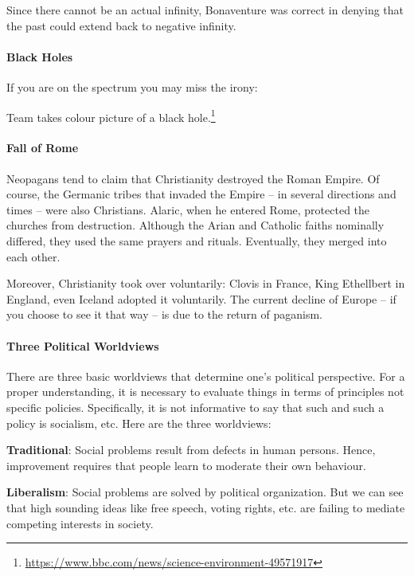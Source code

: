 Since there cannot be an actual infinity, Bonaventure was correct in denying that the past could extend back to negative infinity.

\paragraph{Black Holes}


If you are on the spectrum you may miss the irony:

Team takes colour picture of a black hole.\footnote{\url{https://www.bbc.com/news/science-environment-49571917}}

\paragraph{Fall of Rome}


Neopagans tend to claim that Christianity destroyed the Roman Empire. Of course, the Germanic tribes that invaded the Empire -- in several directions and times -- were also Christians. Alaric, when he entered Rome, protected the churches from destruction. Although the Arian and Catholic faiths nominally differed, they used the same prayers and rituals. Eventually, they merged into each other.

Moreover, Christianity took over voluntarily: Clovis in France, King Ethellbert in England, even Iceland adopted it voluntarily. The current decline of Europe -- if you choose to see it that way -- is due to the return of paganism.

\paragraph{Three Political Worldviews}


There are three basic worldviews that determine one's political perspective. For a proper understanding, it is necessary to evaluate things in terms of principles not specific policies. Specifically, it is not informative to say that such and such a policy is socialism, etc. Here are the three worldviews:

\textbf{Traditional}: Social problems result from defects in human persons. Hence, improvement requires that people learn to moderate their own behaviour.

\textbf{Liberalism}: Social problems are solved by political organization. But we can see that high sounding ideas like free speech, voting rights, etc. are failing to mediate competing interests in society.

